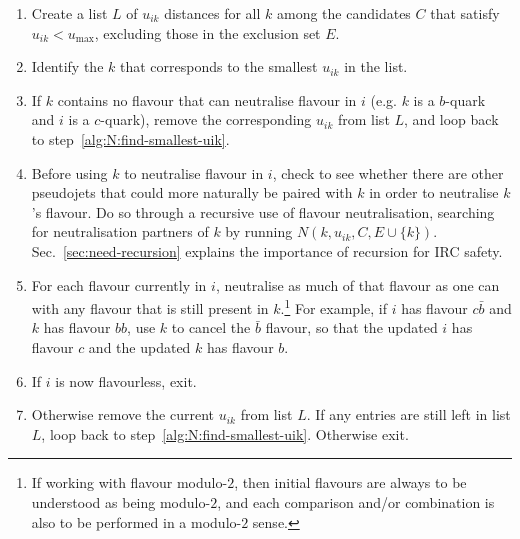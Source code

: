 \documentclass[nofootinbib,twocolumn,preprintnumbers,superscriptaddress,aps]{revtex4-2}
\begin{document}
\begin{enumerate}[label=N\arabic*.,ref=N\arabic*]
  
\item \label{alg:N:N0} Create a list $L$ of $u_{ik}$ distances for all
  $k$ among the candidates $C$ that satisfy $u_{ik} < u_{\max}$,
  excluding those in the exclusion set $E$.
  
\item \label{alg:N:find-smallest-uik}
  Identify the $k$ that corresponds to the smallest $u_{ik}$ in the list.
\item If $k$ contains no flavour that can neutralise flavour in $i$
  (e.g. $k$ is a $b$-quark and $i$ is a $c$-quark), remove the
  corresponding $u_{ik}$ from list $L$, and loop back to
  step~\ref{alg:N:find-smallest-uik}.
\item \label{alg:N:recursion}
  Before using $k$ to neutralise flavour in $i$, check to see
  whether there are other pseudojets that could more naturally be
  paired with $k$ in order to neutralise $k$'s flavour.
  Do so through a recursive use of flavour neutralisation, searching
  for neutralisation partners of $k$ by running
  $N(k,u_{ik},C,E\cup{\{k\}})$.
  Sec.~\ref{sec:need-recursion} explains the importance of
  recursion for IRC safety.
  
\item For each flavour currently in $i$, neutralise as much of that
  flavour as one can with any flavour that is still present in
  $k$.\footnote{If working with flavour modulo-$2$, then initial
    flavours are always to be understood as being modulo-$2$, and each
    comparison and/or combination is also to be performed in a
    modulo-$2$ sense.}
  For example, if $i$ has flavour $c\bar b$ and $k$ has flavour
  $b b$, use $k$ to cancel the $\bar b$ flavour, so that the updated
  $i$ has flavour $c$ and the updated $k$ has flavour $b$.
\item If $i$ is now flavourless, exit.
\item Otherwise remove the current $u_{ik}$ from list $L$.
  If any entries are still left in list $L$, loop back to
  step~\ref{alg:N:find-smallest-uik}.
  Otherwise exit.
\end{enumerate}
\end{document}
